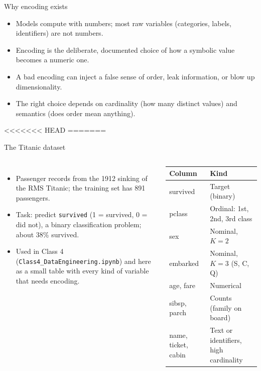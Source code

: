 \begin{frame}{Why encoding exists}
\begin{itemize}
\item Models compute with numbers; most raw variables (categories, labels, identifiers) are not numbers.
\item Encoding is the deliberate, documented choice of how a symbolic value becomes a numeric one.
\item A bad encoding can inject a false sense of order, leak information, or blow up dimensionality.
\item The right choice depends on cardinality (how many distinct values) and semantics (does order mean anything).
\end{itemize}
\coursefooter
\end{frame}

<<<<<<< HEAD
=======
\begin{frame}{The Titanic dataset}
\begin{columns}[T]
\begingroup\small
\begin{itemize}
\item Passenger records from the 1912 sinking of the RMS Titanic; the training set has 891 passengers.
\item Task: predict \texttt{survived} (1 = survived, 0 = did not), a binary classification problem; about 38\% survived.
\item Used in Class 4 (\texttt{Class4\_DataEngineering.ipynb}) and here as a small table with every kind of variable that needs encoding.
\end{itemize}
\par\endgroup
{}
\begingroup\footnotesize
\renewcommand{\arraystretch}{1.25}
\begin{tabularx}{\textwidth}{>{\ttfamily}l >{\raggedright\arraybackslash}X}
Column & \bfseries Kind \\
\toprule
survived & Target (binary) \\
pclass & Ordinal: 1st, 2nd, 3rd class \\
sex & Nominal, $K = 2$ \\
embarked & Nominal, $K = 3$ (S, C, Q) \\
age, fare & Numerical \\
sibsp, parch & Counts (family on board) \\
name, ticket, cabin & Text or identifiers, high cardinality \\
\bottomrule
\end{tabularx}
\par\endgroup
\end{columns}
\coursefooter
\end{frame}


